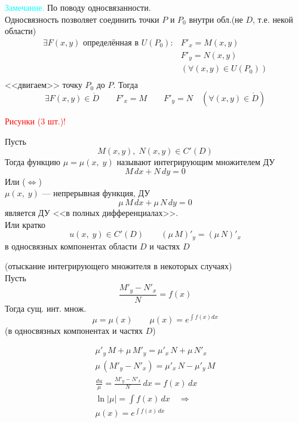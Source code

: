 \begin{Proof}
\begin{enumerate}
            \textcolor{cyan}{Замечание.} По поводу односвязанности.\\
            Односвязность позволяет соединить точки $P$ и $P_0$ внутри обл.(не $D$, т.е. некой области)\\
            \begin{align*}
                \exists F(x,y) \text{ определённая в } U(P_0): &F'_x=M(x,y)\\
                &F'_y=N(x,y)\\
                &(\forall (x,y) \in U(P_0))\\
            \end{align*}
            <<двигаем>> точку $P_0$ до $P$. Тогда\\
            \[
                \exists F(x,y) \in \mathring{D} \qquad  F'_x=M \qquad F'_y=N \quad (\forall (x,y) \in \mathring{D})
            \]
    \end{enumerate}

    \textcolor{red}{Рисунки (3 шт.)!}\\
\end{Proof}

\begin{Def}
    Пусть 
    \[
        M(x,y),\; N(x,y) \in C'(D)
    \]
    Тогда функцию $\mu = \mu(x,\;y)$ называют интегрирующим множителем ДУ
    \[
        M\,dx + N\,dy=0
    \]
    Или ($\Leftrightarrow$)\\
    $\mu(x,\;y)$ --- непрерывная функция, ДУ\\
    \[
        \mu\,M\,dx+ \mu\,N\,dy = 0
    \] 
    является ДУ <<в полных дифференциалах>>.\\
    Или кратко
    \[
        u(x,\;y) \in C'(D) \qquad (\mu\,M)'_y=(\mu\,N)'_x
    \]
    в односвязных компонентах области $D$ и частях $D$
\end{Def}


\begin{Note}(отыскание интегрирующего множителя в некоторых случаях)\\
    Пусть 
    \[
        \frac{M'_y-N'_x}{N}=f(x)
    \]
    Тогда сущ. инт. множ.
    \[
        \mu=\mu(x) \qquad \mu(x)=e^{\int f(x)dx}
    \]
    (в односвязных компонентах и частях $D$)
\end{Note}  

\begin{Proof}
    \begin{gather*}
        \mu'_y\,M+\mu\,M'_y=\mu'_x\,N+\mu\,N'_x\\
        \mu\,(M'_y-N'_x)=\mu'_x\,N-\mu'_y\,M\\
        \frac{du}{\mu}=\frac{M'_y-N'_x}{N}\,dx=f(x)\,dx\\
        \ln|\mu|=\int f(x)\,dx \quad \Rightarrow\\
        \mu(x)=e^{\int f(x)\,dx}\\
    \end{gather*}
\end{Proof}

